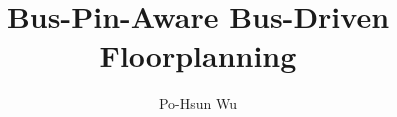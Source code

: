 \documentclass[12pt, a4paper]{report}
\title{Bus-Pin-Aware Bus-Driven Floorplanning} %
\author{Po-Hsun Wu}            %
\begin{document}
\newcommand\cTitle{論文題目}
\newcommand\eTitle{MY THESIS TITLE}
\newcommand\myCname{胡庭瑜}
\newcommand\myEname{Ting-Yu Hu}
\newcommand\advisorCnameA{陳朝鈞博士}
\newcommand\advisorEnameA{Dr.~Chao-Chun~Chen}
\newcommand\advisorCnameB{莊坤達博士}
\newcommand\advisorEnameB{Dr.~Kun-Da~Chuang}
\newcommand\advisorCnameC{王鼎超博士}
\newcommand\advisorEnameC{Dr.~Ding-Chau~Wang}
\newcommand\univCname{成功大學}
\newcommand\univEname{National Cheng Kung University}
\newcommand\deptCname{製造資訊與系統研究所}
\newcommand\fulldeptEname{Institue of Manufacturing Information and Systems}
\newcommand\deptEname{Inst. of Manuf. Info. \& Sys.}
\newcommand\collEname{College of Electrical Engineering and Computer Science}
\newcommand\degreeCname{碩士}
\newcommand\degreeEname{Master of Engineering}
\newcommand\cYear{一○一}
\newcommand\cMonth{七}
\newcommand\eYear{2012}
\newcommand\eMonth{June}
\newcommand\ePlace{Tainan, Taiwan}




\ifx\hypersetup\undefined
	\relax  %
\else
	\hypersetup{
	pdftitle=\cTitle,
	pdfauthor=\myCname}
\fi
	
\end{document}
